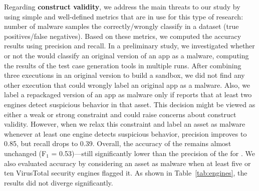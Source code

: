 \begin{comment}    
Regarding the \textbf{correlation between dataset properties and accuracy drop}, after running statistical tests (logistic regression),
we could not find evidence that the \emph{diversity} of the
complete dataset---in terms of similarity score and types of malware-
is responsible for the higher number of false negatives of the mining
sandbox approach. This implies that there was no 1-1 correlation between the brackets of similarity index, malware types to the drops in accuracy. Therefore, further research is necessary to investigate
other possible reasons for that. Perhaps, the complete dataset
contains a large percentage of malware that use more
advanced techniques to evade from both static and dynamic analysis---
both methods are used in the mining sandbox approach
we discussed in this paper.
\end{comment}


Regarding {\bf construct validity}, we address the main threats to our study by using simple and
well-defined metrics that are in use for this type of research: number of malware samples the
\mas correctly/wrongly classify in a dataset (true positives/false negatives).
Based on these metrics, we computed the accuracy results using precision and recall. In a preliminary study, we
investigated whether or not the \mas would classify an original version of an app as a malware,
computing the results of the test case generation tools in multiple runs. After combining three executions
in an original version to build a sandbox, we did not find any other execution that could wrongly
label an original app as a malware. Also, we label a repackaged version of an app as malware
  only if \vt reports that at least two engines detect suspicious behavior in that asset.
  This decision might be viewed as either a weak or strong constraint and could
  raise concerns about construct validity. However, when we relax this constraint and label an asset as malware whenever at least one engine detects suspicious behavior, precision improves to 0.85,
  but recall drops to 0.39. Overall, the accuracy of the \mas remains almost unchanged (F$_1$ = 0.53)---still significantly lower than the precision of the \mas for \sds.
  We also evaluated accuracy by considering an asset as malware when at least five or ten VirusTotal security engines flagged it. As shown in Table~\ref{tab:engines},
  the results did not diverge significantly.


